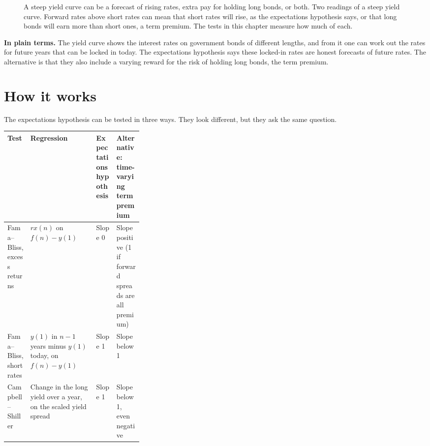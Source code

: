 \begin{figure}[htbp]
\centering
{}
\caption{A steep yield curve can be a forecast of rising rates, extra pay for holding long bonds, or both. Two readings of a steep yield curve. Forward rates above short rates can mean that short rates will rise, as the expectations hypothesis says, or that long bonds will earn more than short ones, a term premium. The tests in this chapter measure how much of each.}
\label{fig:07-readings}
\end{figure}

\noindent\textbf{In plain terms.} The yield curve shows the interest rates on government bonds of different lengths, and from it one can work out the rates for future years that can be locked in today. The expectations hypothesis says these locked-in rates are honest forecasts of future rates. The alternative is that they also include a varying reward for the risk of holding long bonds, the term premium.

\section{How it works}
\label{sec:07-how}

The expectations hypothesis can be tested in three ways. They look different, but they ask the same question.

\begin{center}
\small
\begin{tabularx}{0.9\linewidth}{@{}>{\raggedright\arraybackslash}p{0.17\linewidth}>{\raggedright\arraybackslash}X>{\raggedright\arraybackslash}p{0.15\linewidth}>{\raggedright\arraybackslash}X@{}}
\toprule
Test & Regression & Expectations hypothesis & Alternative: time-varying term premium \\
\midrule
Fama--Bliss, excess returns & $rx(n)$ on $f(n) - y(1)$ & Slope 0 & Slope positive (1 if forward spreads are all premium) \\
Fama--Bliss, short rates & $y(1)$ in $n-1$ years minus $y(1)$ today, on $f(n) - y(1)$ & Slope 1 & Slope below 1 \\
Campbell--Shiller & Change in the long yield over a year, on the scaled yield spread & Slope 1 & Slope below 1, even negative \\
\bottomrule
\end{tabularx}
\end{center}

